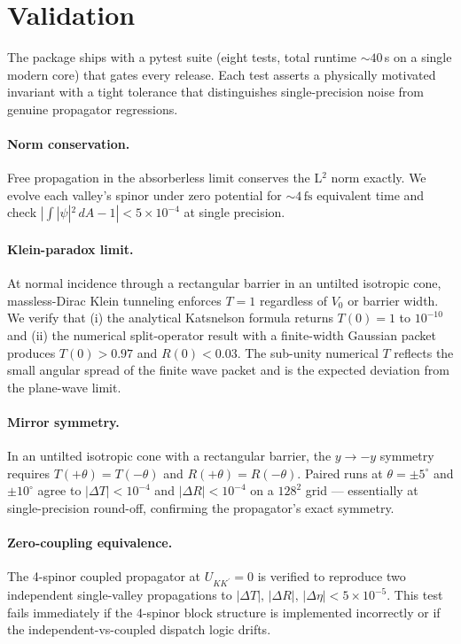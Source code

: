 \documentclass[preprint, 11pt]{elsarticle}
\begin{document}
\section{Validation}
\label{sec:validation}

The package ships with a pytest suite (eight tests, total runtime
${\sim}40$\,s on a single modern core) that gates every release.
Each test asserts a physically motivated invariant with a tight
tolerance that distinguishes single-precision noise from genuine
propagator regressions.

\paragraph{Norm conservation.}
Free propagation in the absorberless limit conserves the L$^2$ norm
exactly. We evolve each valley's spinor under zero potential for
${\sim}4\,\text{fs}$ equivalent time and check
$|\int|\psi|^2\,dA - 1|<5\times10^{-4}$ at single precision.

\paragraph{Klein-paradox limit.}
At normal incidence through a rectangular barrier in an untilted
isotropic cone, massless-Dirac Klein tunneling enforces $T=1$
regardless of $V_0$ or barrier width. We verify that (i) the
analytical Katsnelson formula \cite{Katsnelson2006} returns
$T(0)=1$ to $10^{-10}$ and (ii) the numerical split-operator result
with a finite-width Gaussian packet produces $T(0)>0.97$ and
$R(0)<0.03$. The sub-unity numerical $T$ reflects the small angular
spread of the finite wave packet and is the expected deviation from
the plane-wave limit.

\paragraph{Mirror symmetry.}
In an untilted isotropic cone with a rectangular barrier, the
$y\to-y$ symmetry requires $T(+\theta)=T(-\theta)$ and
$R(+\theta)=R(-\theta)$. Paired runs at $\theta=\pm5^\circ$ and
$\pm10^\circ$ agree to $|\Delta T|<10^{-4}$ and $|\Delta R|<10^{-4}$
on a $128^2$ grid --- essentially at single-precision round-off,
confirming the propagator's exact symmetry.

\paragraph{Zero-coupling equivalence.}
The 4-spinor coupled propagator at $U_{KK^\prime}=0$ is verified to
reproduce two independent single-valley propagations to
$|\Delta T|,\,|\Delta R|,\,|\Delta \eta|<5\times10^{-5}$. This test
fails immediately if the 4-spinor block structure is implemented
incorrectly or if the independent-vs-coupled dispatch logic drifts.
\end{document}
